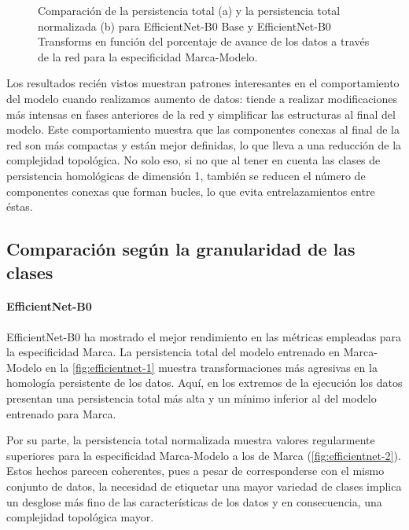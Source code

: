 \begin{figure}[H]
\begin{subfigure}
		\caption{Persistencia total normalizada según el porcentaje de avance en la
			red para el modelo base entrenado EfficientNet-B0 y su versión con aumento
			de datos.}
		\label{fig:mm-homology-2}
	\end{subfigure}
	\caption{Comparación de la persistencia total (a) y la persistencia total
		normalizada (b) para EfficientNet-B0 Base y EfficientNet-B0 Transforms en
		función del porcentaje de avance de los datos a través de la red para la
		especificidad Marca-Modelo.}
	\label{fig:mm-homology}
\end{figure}

Los resultados recién vistos muestran patrones interesantes en el comportamiento
del modelo cuando realizamos aumento de datos: tiende a realizar modificaciones más
intensas en fases anteriores de la red y simplificar las estructuras al final del
modelo. Este comportamiento muestra que las componentes conexas al final de la
red son más compactas y están mejor definidas, lo que lleva a una reducción de la
complejidad topológica. No solo eso, si no que al tener en cuenta las clases de persistencia
homológicas de dimensión 1, también se reducen el número de componentes conexas
que forman bucles, lo que evita entrelazamientos entre éstas.

\subsection{Comparación según la granularidad de las clases}
\label{subsec:grano}

\paragraph{EfficientNet-B0}

EfficientNet-B0 ha mostrado el mejor rendimiento en las métricas empleadas para
la especificidad Marca. La persistencia total del modelo entrenado en Marca-Modelo
en la \autoref{fig:efficientnet-1} muestra transformaciones más agresivas en la homología
persistente de los datos. Aquí, en los extremos de la ejecución los datos presentan
una persistencia total más alta y un mínimo inferior al del modelo entrenado para
Marca.

Por su parte, la persistencia total normalizada muestra valores regularmente
superiores para la especificidad Marca-Modelo a los de Marca (\autoref{fig:efficientnet-2}).
Estos hechos parecen coherentes, pues a pesar de corresponderse con el mismo
conjunto de datos, la necesidad de etiquetar una mayor variedad de clases implica
un desglose más fino de las características de los datos y en consecuencia, una
complejidad topológica mayor.


